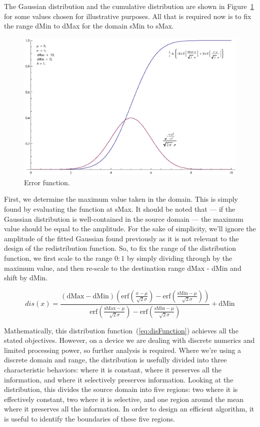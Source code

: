 The Gaussian distribution and the cumulative distribution are shown in Figure~\ref{fig:ErrorFunctionGraph} for some values chosen for illustrative purposes. All that is required now is to fix the range dMin to dMax for the domain sMin to sMax.

\begin{figure}[h!]
  \caption{Error function.}
  \label{fig:ErrorFunctionGraph}
  \centering
    \includegraphics[width=\textwidth]{Chapter2/Figs/errorFunction.eps}
\end{figure}

First, we determine the maximum value taken in the domain. This is simply found by evaluating the function at sMax. It should be noted that --- if the Gaussian distribution is well-contained in the source domain --- the maximum value should be equal to the amplitude. For the sake of simplicity, we'll ignore the amplitude of the fitted Gaussian found previously as it is not relevant to the design of the redistribution function. So, to fix the range of the distribution function, we first scale to the range $0:1$ by simply dividing through by the maximum value, and then re-scale to the destination range dMax - dMin and shift by dMin.

\begin{equation}\label{eq:disFunction}
  dis(x) = \frac{(\text{dMax}-\text{dMin}) \left(\text{erf}\left(\frac{x-\mu }{\sqrt{2} \sigma }\right)-\text{erf}\left(\frac{\text{sMin}-\mu }{\sqrt{2} \sigma }\right)\right)}{\text{erf}\left(\frac{\text{sMax}-\mu }{\sqrt{2} \sigma }\right)-\text{erf}\left(\frac{\text{sMin}-\mu }{\sqrt{2} \sigma }\right)}+\text{dMin}
\end{equation}

Mathematically, this distribution function~(\ref{eq:disFunction}) achieves all the stated objectives. However, on a device we are dealing with discrete numerics and limited processing power, so further analysis is required. Where we're using a discrete domain and range, the distribution is usefully divided into three characteristic behaviors:  where it is constant, where it preserves all the information, and where it selectively preserves information. Looking at the distribution, this divides the source domain into five regions: two where it is effectively constant, two where it is selective, and one region around the mean where it preserves all the information. In order to design an efficient algorithm, it is useful to identify the boundaries of these five regions.

